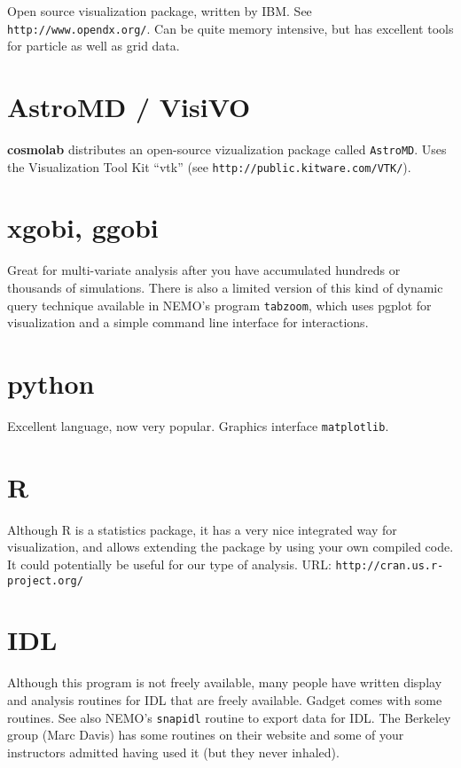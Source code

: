 Open source visualization package, written by IBM. See 
{\tt http://www.opendx.org/}. Can be quite memory intensive, but has
excellent tools for particle as well as grid data.

\section{AstroMD / VisiVO}

{\bf cosmolab} distributes an open-source vizualization package 
called {\tt AstroMD}.  Uses the Visualization Tool Kit ``vtk''
(see {\tt http://public.kitware.com/VTK/}).

\section{xgobi, ggobi}

Great for multi-variate analysis after you have accumulated hundreds
or thousands of simulations. There is also a limited version of
this kind of dynamic query technique available in 
NEMO's program {\tt tabzoom}, which uses pgplot for visualization
and a simple command line interface for interactions.

\section{python}

Excellent language, now very popular. Graphics interface {\tt matplotlib}.


\section{R}

Although R is a statistics package, it has a very nice integrated
way for visualization, and allows extending the package by using
your own compiled code. It could potentially be useful for our
type of analysis. URL: {\tt http://cran.us.r-project.org/}


\section{IDL}

Although this program is not freely available, 
many people have written display and 
analysis routines for IDL that are freely available.
Gadget comes with some
routines. See also NEMO's {\tt snapidl} routine to export data for IDL.
The Berkeley group (Marc Davis) has some routines on their website
and some of your instructors admitted having used it (but they never inhaled).

